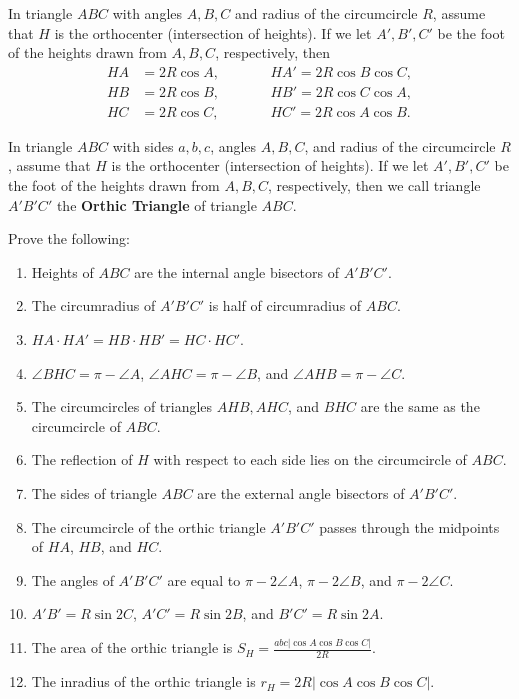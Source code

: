 \documentclass[12pt,a4paper]{memoir}
\theoremstyle{definition}
\begin{document}
\begin{question}[name=Calculating Distance from Orthocenter]
	In triangle $ABC$ with angles $A,B,C$ and radius of the circumcircle $R$, assume that $H$ is the orthocenter (intersection of heights). If we let $A',B',C'$ be the foot of the heights drawn from $A,B,C$, respectively, then
	\begin{align*}
		HA &= 2R \cos A, \qquad && HA' = 2R \cos B \cos C,\\
		HB &= 2R \cos B, \qquad && HB' = 2R \cos C \cos A,\\
		HC &= 2R \cos C, \qquad && HC' = 2R \cos A \cos B.
	\end{align*}
\end{question}


	\begin{question}[name=Trigonometry of the Orthic Triangle]
		In triangle $ABC$ with sides $a,b,c$, angles $A,B,C$, and radius of the circumcircle $R$, assume that $H$ is the orthocenter (intersection of heights). If we let $A',B',C'$ be the foot of the heights drawn from $A,B,C$, respectively, then we call triangle $A'B'C'$ the \textbf{Orthic Triangle} of triangle $ABC$. 
		
		Prove the following:
		\begin{enumerate}
			\item Heights of $ABC$ are the internal angle bisectors of $A'B'C'$.
			\item The circumradius of $A'B'C'$ is half of circumradius of $ABC$.
			\item $HA \cdot HA' = HB \cdot HB' = HC \cdot HC'$.
			\item $\angle BHC = \pi - \angle A$, $\angle AHC = \pi - \angle B$, and $\angle AHB = \pi - \angle C$.
			\item The circumcircles of triangles $AHB, AHC$, and $BHC$ are the same as the circumcircle of $ABC$.
			\item The reflection of $H$ with respect to each side lies on the circumcircle of $ABC$.
			\item The sides of triangle $ABC$ are the external angle bisectors of  $A'B'C'$.
			\item The circumcircle of the orthic triangle $A'B'C'$ passes through the midpoints of $HA$, $HB$, and $HC$.
			\item The angles of $A'B'C'$ are equal to $\pi - 2\angle A$, $\pi - 2\angle B$, and $\pi - 2\angle C$.
			\item $A'B'= R\sin 2C$, $A'C'=R\sin 2B$, and $B'C'=R\sin 2A$.
			\item The area of the orthic triangle is $\displaystyle S_H = \frac{abc|\cos A \cos B \cos C|}{2R}$.
			\item The inradius of the orthic triangle is $\displaystyle r_H = 2R |\cos A \cos B \cos C|$.
		\end{enumerate}
	\end{question}
\end{document}
